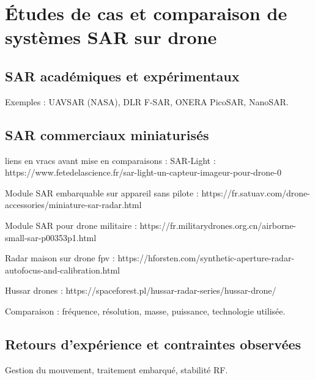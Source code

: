 \section{Études de cas et comparaison de systèmes SAR sur drone}\label{SEC:Études de cas et comparaison de systèmes SAR sur drone}

\subsection{SAR académiques et expérimentaux}

Exemples : UAVSAR (NASA), DLR F-SAR, ONERA PicoSAR, NanoSAR.


\subsection{SAR commerciaux miniaturisés}
liens en vracs avant mise en comparaisons : 
SAR-Light : https://www.fetedelascience.fr/sar-light-un-capteur-imageur-pour-drone-0 	

Module SAR embarquable sur appareil sans pilote : https://fr.satuav.com/drone-accessories/miniature-sar-radar.html 

Module SAR pour drone militaire : https://fr.militarydrones.org.cn/airborne-small-sar-p00353p1.html 

Radar maison sur drone fpv : https://hforsten.com/synthetic-aperture-radar-autofocus-and-calibration.html 

Hussar drones : https://spaceforest.pl/hussar-radar-series/hussar-drone/ 


Comparaison : fréquence, résolution, masse, puissance, technologie utilisée.


\subsection{Retours d’expérience et contraintes observées}

Gestion du mouvement, traitement embarqué, stabilité RF.
